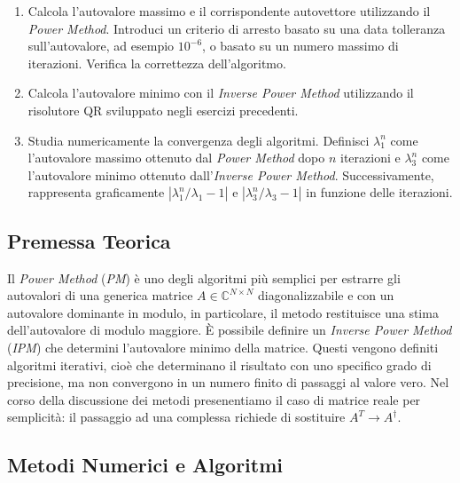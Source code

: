\documentclass[11pt, a4paper]{article}
\begin{document}
\begin{enumerate}
    \item Calcola l'autovalore massimo e il corrispondente autovettore utilizzando il \textit{Power Method}. Introduci un criterio di arresto basato su una data tolleranza sull'autovalore, ad esempio $10^{-6}$, o basato su un numero massimo di iterazioni. Verifica la correttezza dell'algoritmo.
    
    \item Calcola l'autovalore minimo con il \textit{Inverse Power Method} utilizzando il risolutore QR sviluppato negli esercizi precedenti.
    
    \item Studia numericamente la convergenza degli algoritmi. Definisci $\lambda_1^n$ come l'autovalore massimo ottenuto dal \textit{Power Method} dopo $n$ iterazioni e $\lambda_3^n$ come l'autovalore minimo ottenuto dall'\textit{Inverse Power Method}. Successivamente, rappresenta graficamente $|\lambda_1^n / \lambda_1 - 1|$ e $|\lambda_3^n / \lambda_3 - 1|$ in funzione delle iterazioni.
\end{enumerate}

\subsection{Premessa Teorica}
Il \textit{Power Method} (\textit{PM}) è uno degli algoritmi più semplici per estrarre gli autovalori di una generica matrice $A \in \mathbb{C}^{N \times N}$ diagonalizzabile e con un autovalore dominante in modulo, in particolare, il metodo restituisce una stima dell'autovalore di modulo maggiore. È possibile definire un \textit{Inverse Power Method} (\textit{IPM}) che determini l'autovalore minimo della matrice. Questi vengono definiti algoritmi iterativi, cioè che determinano il risultato con uno specifico grado di precisione, ma non convergono in un numero finito di passaggi al valore vero. Nel corso della discussione dei metodi presenentiamo il caso di matrice reale per semplicità: il passaggio ad una complessa richiede di sostituire $A^T \longrightarrow A^\dagger$.

\subsection{Metodi Numerici e Algoritmi}
\end{document}
